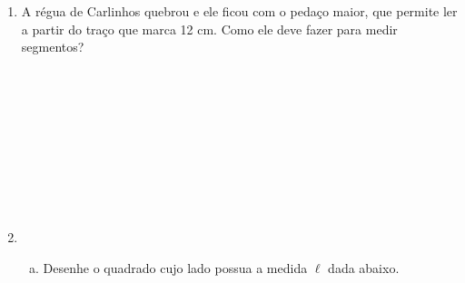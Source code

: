 \documentclass[a4paper,14pt]{article}
\begin{document}
\begin{multicols}{2}
\begin{enumerate}
			\item A régua de Carlinhos quebrou e ele ficou com o pedaço maior, que permite ler a partir do traço que marca 12 cm. Como ele deve fazer para medir segmentos? \\\\\\\\\\\\\\\\\\\\
			\item \begin{enumerate}[a)]
				\item Desenhe o quadrado cujo lado possua a medida $\ell$ dada abaixo.
				\begin{center}
				\end{center}
			\end{enumerate}
		\end{enumerate}

\end{multicols}
\end{document}
